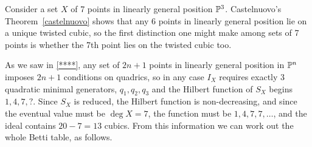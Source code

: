 \begin{example}
 Consider a set $X$ of 7 points in linearly general position ${\mathbb P}^3$. 
Castelnuovo's Theorem~\ref{castelnuovo} shows that any 6 points in linearly general position lie on a unique twisted cubic, so the first distinction one might make among sets of 7 points is whether the 7th point lies on the twisted cubic too.

As we saw in \ref{****}, any set of $2n+1$ points in linearly general position in ${\mathbb P}^{n}$ imposes $2n+1$ conditions on quadrics, so in any case $I_{X}$ requires exactly 3 quadratic minimal generators, $q_{1},q_{2},q_{3}$ and the Hilbert function of $S_{X}$ begins $1,4,7,?$. Since $S_{X}$ is reduced, the Hilbert function is non-decreasing, and since the eventual value must be $\deg X = 7$, the function must be
$1,4,7,7,\dots$, and the ideal contains $20-7 = 13$ cubics. From this information we can work out the whole Betti table, as follows. 


\end{example}
